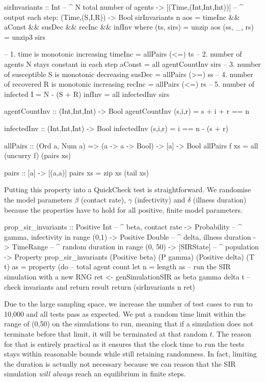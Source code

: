 \begin{HaskellCode}
sirInvariants :: Int                    -- ^ N total number of agents
              -> [(Time,(Int,Int,Int))] -- ^ output each step: (Time,(S,I,R))
              -> Bool
sirInvariants n aos = timeInc && aConst && susDec && recInc && infInv
  where
    (ts, sirs)  = unzip aos
    (ss, _, rs) = unzip3 sirs

    -- 1. time is monotonic increasing
    timeInc = allPairs (<=) ts
    -- 2. number of agents N stays constant in each step
    aConst = all agentCountInv sirs
    -- 3. number of susceptible S is monotonic decreasing
    susDec = allPairs (>=) ss
    -- 4. number of recovered R is monotonic increasing
    recInc = allPairs (<=) rs
    -- 5. number of infected I = N - (S + R)
    infInv = all infectedInv sirs

    agentCountInv :: (Int,Int,Int) -> Bool
    agentCountInv (s,i,r) = s + i + r == n

    infectedInv :: (Int,Int,Int) -> Bool
    infectedInv (s,i,r) = i == n - (s + r)

    allPairs :: (Ord a, Num a) => (a -> a -> Bool) -> [a] -> Bool
    allPairs f xs = all (uncurry f) (pairs xs)

    pairs :: [a] -> [(a,a)]
    pairs xs = zip xs (tail xs)
\end{HaskellCode}

Putting this property into a QuickCheck test is straightforward. We randomise the model parameters $\beta$ (contact rate), $\gamma$ (infectivity) and $\delta$ (illness duration) because the properties have to hold for all positive, finite model parameters.

\begin{HaskellCode}
prop_sir_invariants :: Positive Int    -- ^ beta, contact rate
                    -> Probability     -- ^ gamma, infectivity in range (0,1)
                    -> Positive Double -- ^ delta, illness duration
                    -> TimeRange       -- ^ random duration in range (0, 50)
                    -> [SIRState]      -- ^ population
                    -> Property
prop_sir_invariants 
    (Positive beta) (P gamma) (Positive delta) (T t) as  = property (do
  -- total agent count
  let n = length as
  -- run the SIR simulation with a new RNG 
  ret <- genSimulationSIR as beta gamma delta t
  -- check invariants and return result
  return (sirInvariants n ret)
\end{HaskellCode}

Due to the large sampling space, we increase the number of test cases to run to 10,000 and all tests pass as expected. We put a random time limit within the range of (0,50) on the simulations to run, meaning that if a simulation does not terminate before that limit, it will be terminated at that random $t$. The reason for that is entirely practical as it ensures that the clock time to run the tests stays within reasonable bounds while still retaining randomness. In fact, limiting the duration is actually not necessary because we can reason that the SIR simulation \textit{will always} reach an equilibrium in finite steps. %

